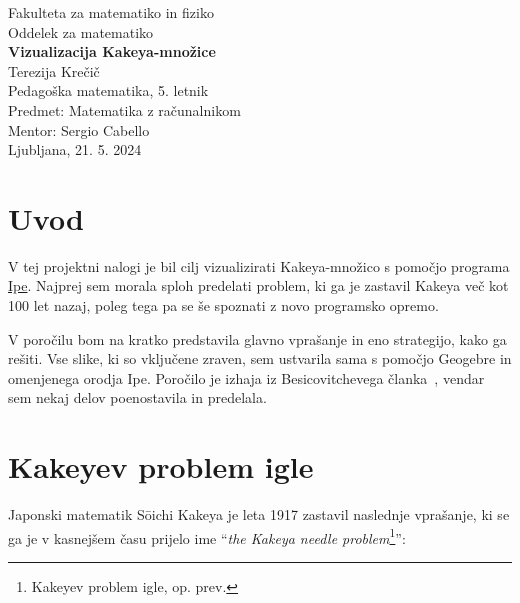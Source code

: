 \documentclass[a4paper, 12pt]{article}
\begin{document}
\begin{titlepage}
    \begin{center}
        \large
        Fakulteta za matematiko in fiziko\\
        Oddelek za matematiko \\
        \vspace{6cm}
        \Huge
        \textbf{Vizualizacija Kakeya-množice} \\
        \vspace{6cm}
        \large
        Terezija Krečič\\
        Pedagoška matematika, 5. letnik\\
        \vspace{1cm}
        Predmet: Matematika z računalnikom \\
        Mentor: Sergio Cabello\\
        \vspace{2cm}
        Ljubljana, 21. 5. 2024
    \end{center}
\end{titlepage}

\newpage



\section*{Uvod}

V tej projektni nalogi je bil cilj vizualizirati Kakeya-množico s pomočjo programa \href{https://ipe.otfried.org/}{Ipe}. Najprej sem morala sploh predelati problem, ki ga je zastavil Kakeya več kot 100 let nazaj, poleg tega pa se še spoznati z novo programsko opremo.

V poročilu bom na kratko predstavila glavno vprašanje in eno strategijo, kako ga rešiti. Vse slike, ki so vključene zraven, sem ustvarila sama s pomočjo Geogebre in omenjenega orodja Ipe. Poročilo je izhaja iz Besicovitchevega članka~\cite{Besicovitch}, vendar sem nekaj delov poenostavila in predelala.


\section*{Kakeyev problem igle}

Japonski matematik Sōichi Kakeya je leta 1917 zastavil naslednje vprašanje, ki se ga je v kasnejšem času prijelo ime ``\emph{the Kakeya needle problem}\footnote{Kakeyev problem igle, op. prev.}'':
\end{document}
